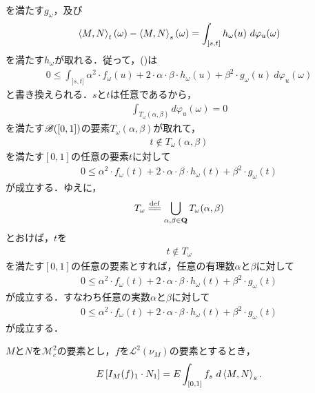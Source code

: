 \begin{sketch}
\begin{align}
		\end{align}
		を満たす$g_{\omega}$，及び
		\begin{align}
			\inprod<M,N>_{t}(\omega) - \inprod<M,N>_{s}(\omega)
			= \int_{]s,t]} h_{\omega}(u)\ d\varphi_{u}(\omega)
		\end{align}
		を満たす$h_{\omega}$が取れる．従って，()は
		\begin{align}
			0 \leq \int_{]s,t]} \alpha^{2} \cdot f_{\omega}(u) + 2 \cdot \alpha \cdot \beta
			\cdot h_{\omega}(u) + \beta^{2} \cdot g_{\omega}(u)\ d\varphi_{u}(\omega)
		\end{align}
		と書き換えられる．$s$と$t$は任意であるから，
		\begin{align}
			\int_{T_{\omega}(\alpha,\beta)} d\varphi_{u}(\omega) = 0
		\end{align}
		を満たす$\mathscr{B}([0,1])$の要素$T_{\omega}(\alpha,\beta)$が取れて，
		\begin{align}
			t \notin T_{\omega}(\alpha,\beta)
		\end{align}
		を満たす$[0,1]$の任意の要素$t$に対して
		\begin{align}
			0 \leq \alpha^{2} \cdot f_{\omega}(t) + 2 \cdot \alpha \cdot \beta
			\cdot h_{\omega}(t) + \beta^{2} \cdot g_{\omega}(t)
		\end{align}
		が成立する．ゆえに，
		\begin{align}
			T_{\omega} \defeq \bigcup_{\alpha,\beta \in \Q} T_{\omega}(\alpha,\beta)
		\end{align}
		とおけば，$t$を
		\begin{align}
			t \notin T_{\omega}
		\end{align}
		を満たす$[0,1]$の任意の要素とすれば，任意の有理数$\alpha$と$\beta$に対して
		\begin{align}
			0 \leq \alpha^{2} \cdot f_{\omega}(t) + 2 \cdot \alpha \cdot \beta
			\cdot h_{\omega}(t) + \beta^{2} \cdot g_{\omega}(t)
		\end{align}
		が成立する．すなわち任意の実数$\alpha$と$\beta$に対して
		\begin{align}
			0 \leq \alpha^{2} \cdot f_{\omega}(t) + 2 \cdot \alpha \cdot \beta
			\cdot h_{\omega}(t) + \beta^{2} \cdot g_{\omega}(t)
		\end{align}
		が成立する．
	\end{sketch}
	
	\begin{screen}
		\begin{thm}
			$M$と$N$を$\mathscr{M}_{c}^{2}$の要素とし，$f$を$\mathscr{L}^{2}(\nu_{M})$の要素とするとき，
			\begin{align}
				E\left[I_{M}(f)_{1} \cdot N_{1}\right] = E\int_{[0,1]} f_{s}\ d\inprod<M,N>_{s}.
			\end{align}
		\end{thm}
	\end{screen}
	
